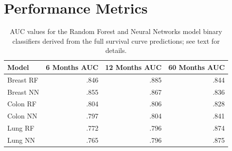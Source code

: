 \documentclass[a4paper,11pt]{article}
\begin{document}










\section{Performance Metrics}
\label{sec:performancemetrics}



\begin{table}[tbp]
\begin{center}
\begin{tabular}{lrrr}
\toprule
Model & 6 Months AUC & 12 Months AUC & 60 Months AUC \\ 
\midrule
Breast RF &  .846       &     .885           &  .844 \\ 
Breast NN &   .855      &     .867      &    .836 \\ 
Colon RF  &     .804          &      .806           &      .828           \\ 
Colon NN   &     .797          &          .804         &   .841  \\ 
Lung RF    &      .772               &        .796               &   .874  \\ 
Lung NN    &        .765              &        .796               &  .875  \\
\bottomrule
\end{tabular}
\caption{\label{tab:AUC} AUC values for the Random Forest and Neural Networks model
binary classifiers derived from the full survival curve predictions; see text for details.}
\end{center}
\end{table}
\end{document}
